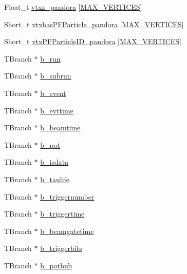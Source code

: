 \begin{DoxyCompactItemize}
Float\-\_\-t \hyperlink{classanatree_a526781b4d6a3cf93890c000047381e8b}{vtxz\-\_\-pandora} \mbox{[}\hyperlink{anatree__core__v09410002__orig_8h_a6ac49acb0970e608315ca232a9fc8828}{M\-A\-X\-\_\-\-V\-E\-R\-T\-I\-C\-E\-S}\mbox{]}
\item 
Short\-\_\-t \hyperlink{classanatree_aa870ef7aa82c721a5711a6ffae151c53}{vtxhas\-P\-F\-Particle\-\_\-pandora} \mbox{[}\hyperlink{anatree__core__v09410002__orig_8h_a6ac49acb0970e608315ca232a9fc8828}{M\-A\-X\-\_\-\-V\-E\-R\-T\-I\-C\-E\-S}\mbox{]}
\item 
Short\-\_\-t \hyperlink{classanatree_a922454b767d4b26fcba1d0af5f3761b4}{vtx\-P\-F\-Particle\-I\-D\-\_\-pandora} \mbox{[}\hyperlink{anatree__core__v09410002__orig_8h_a6ac49acb0970e608315ca232a9fc8828}{M\-A\-X\-\_\-\-V\-E\-R\-T\-I\-C\-E\-S}\mbox{]}
\item 
T\-Branch $\ast$ \hyperlink{classanatree_a19ee2ab2b10de562e5a32f375aa1470f}{b\-\_\-run}
\item 
T\-Branch $\ast$ \hyperlink{classanatree_a301b8c3822e751b592deefb4cbf276fb}{b\-\_\-subrun}
\item 
T\-Branch $\ast$ \hyperlink{classanatree_aff7d04fe7e6a48bed9288c487c70b730}{b\-\_\-event}
\item 
T\-Branch $\ast$ \hyperlink{classanatree_a5e1949d72f71c3126f5da8e8f5064152}{b\-\_\-evttime}
\item 
T\-Branch $\ast$ \hyperlink{classanatree_a18b90820427fcba7bd774a8479a49c97}{b\-\_\-beamtime}
\item 
T\-Branch $\ast$ \hyperlink{classanatree_afa7db061c3fa14487e00911096fe8cf8}{b\-\_\-pot}
\item 
T\-Branch $\ast$ \hyperlink{classanatree_a27613fdc12435fc6b2b2409eb47fdf08}{b\-\_\-isdata}
\item 
T\-Branch $\ast$ \hyperlink{classanatree_a362c47ff63b4ee60de88313c6b109017}{b\-\_\-taulife}
\item 
T\-Branch $\ast$ \hyperlink{classanatree_a9850c9d1ae369044f2ae1b6df6e203e9}{b\-\_\-triggernumber}
\item 
T\-Branch $\ast$ \hyperlink{classanatree_ae056ea0ac78998981ad598acce7c898c}{b\-\_\-triggertime}
\item 
T\-Branch $\ast$ \hyperlink{classanatree_a2361a4c9a52f77105efdc8a5a6474304}{b\-\_\-beamgatetime}
\item 
T\-Branch $\ast$ \hyperlink{classanatree_a17d4d2cfce36b1f8234043c64a764ed2}{b\-\_\-triggerbits}
\item 
T\-Branch $\ast$ \hyperlink{classanatree_ae0efc0a09dcd0178945610bf46c516a3}{b\-\_\-potbnb}

\end{DoxyCompactItemize}
